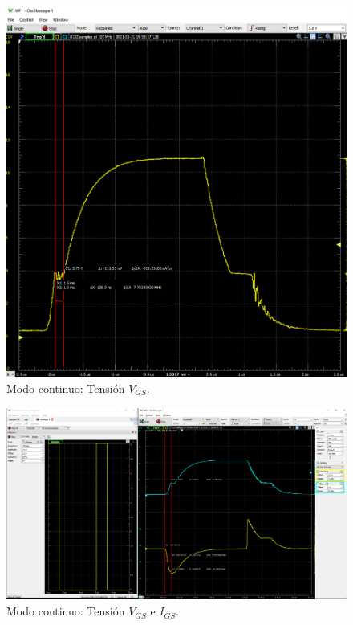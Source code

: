 \begin{figure}[H]
	\centering
	\includegraphics[width=\linewidth]{Imagenes/Continuo_VGS}
	\caption{Modo continuo: Tensión $V_{GS}$.}
	\label{fig:Cont_VGS}
\end{figure}


\begin{figure}[H]
	\centering
	\includegraphics[width=\linewidth]{Imagenes/Continuo_VGS_IG}
	\caption{Modo continuo: Tensión $V_{GS}$ e $I_{GS}$.}
	\label{fig:CONT_VGS_IGS}
\end{figure}

